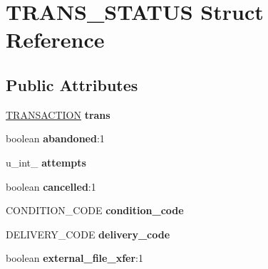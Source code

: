 \hypertarget{struct_t_r_a_n_s___s_t_a_t_u_s}{}\section{T\+R\+A\+N\+S\+\_\+\+S\+T\+A\+T\+US Struct Reference}
\label{struct_t_r_a_n_s___s_t_a_t_u_s}
\subsection*{Public Attributes}
\begin{DoxyCompactItemize}
\item 
\hyperlink{struct_t_r_a_n_s_a_c_t_i_o_n}{T\+R\+A\+N\+S\+A\+C\+T\+I\+ON} {\bfseries trans}\hypertarget{struct_t_r_a_n_s___s_t_a_t_u_s_ac231415ffbaaf1f8458e7a45f1c2dde0}{}\label{struct_t_r_a_n_s___s_t_a_t_u_s_ac231415ffbaaf1f8458e7a45f1c2dde0}

\item 
boolean {\bfseries abandoned}\+:1\hypertarget{struct_t_r_a_n_s___s_t_a_t_u_s_aba5bb97eaf108f40d95a11787ccef9c1}{}\label{struct_t_r_a_n_s___s_t_a_t_u_s_aba5bb97eaf108f40d95a11787ccef9c1}

\item 
u\+\_\+int\+\_ {\bfseries attempts}\hypertarget{struct_t_r_a_n_s___s_t_a_t_u_s_ac85ab7838e832d906891610f590710ea}{}\label{struct_t_r_a_n_s___s_t_a_t_u_s_ac85ab7838e832d906891610f590710ea}

\item 
boolean {\bfseries cancelled}\+:1\hypertarget{struct_t_r_a_n_s___s_t_a_t_u_s_aa67e3098cacdbb149e3cd2e51896b429}{}\label{struct_t_r_a_n_s___s_t_a_t_u_s_aa67e3098cacdbb149e3cd2e51896b429}

\item 
C\+O\+N\+D\+I\+T\+I\+O\+N\+\_\+\+C\+O\+DE {\bfseries condition\+\_\+code}\hypertarget{struct_t_r_a_n_s___s_t_a_t_u_s_ab2997675b95baf36df9c3082b4a37b3a}{}\label{struct_t_r_a_n_s___s_t_a_t_u_s_ab2997675b95baf36df9c3082b4a37b3a}

\item 
D\+E\+L\+I\+V\+E\+R\+Y\+\_\+\+C\+O\+DE {\bfseries delivery\+\_\+code}\hypertarget{struct_t_r_a_n_s___s_t_a_t_u_s_ab6aed37045d3d77776cfce2b9ec66717}{}\label{struct_t_r_a_n_s___s_t_a_t_u_s_ab6aed37045d3d77776cfce2b9ec66717}

\item 
boolean {\bfseries external\+\_\+file\+\_\+xfer}\+:1\hypertarget{struct_t_r_a_n_s___s_t_a_t_u_s_a25cc52aef10e13b9fb4ac0cd2486bdf0}{}\label{struct_t_r_a_n_s___s_t_a_t_u_s_a25cc52aef10e13b9fb4ac0cd2486bdf0}


\end{DoxyCompactItemize}
